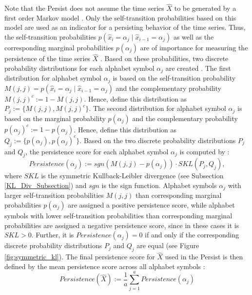Note that the Persist does not assume the time series $\hat{X}$ to be generated by a first order Markov model \cite{Persist}. Only the self-transition probabilities based on this model are used as an indicator for a persisting behavior of the time series. \newline
Thus, the self-transition probabilities $p(\hat{x}_i = \alpha_j \mid \hat{x}_{i-1} = \alpha_j)$ as well as the corresponding marginal probabilities $p(\alpha_j)$ are of importance for measuring the persistence of the time series $\hat{X}$ \cite{Persist}. Based on these probabilities, two discrete probability distributions for each alphabet symbol $\alpha_j$ are created \cite{Persist}. The first distribution for alphabet symbol $\alpha_j$ is based on the self-transition probability $M(j,j) = p(\hat{x}_i = \alpha_j \mid \hat{x}_{i-1} = \alpha_j)$ and the complementary probability $M(j,j)^c := 1 - M(j,j)$. Hence, define this distribution as $P_j := \{M(j,j), M(j,j)^c\}$. The second distribution for alphabet symbol $\alpha_j$ is based on the marginal probability $p(\alpha_j)$ and the complementary probability $p(\alpha_j)^c := 1 - p(\alpha_j)$. Hence, define this distribution as $Q_j := \{p(\alpha_j), p(\alpha_j)^c\}$. \newline
Based on the two discrete probability distributions $P_j$ and $Q_j$, the persistence score for each alphabet symbol $\alpha_j$ is computed by \cite{Persist}:
\begin{equation}
Persistence(\alpha_j) := sgn(M(j,j)-p(\alpha_j)) \cdot SKL(P_j,Q_j),
\label{eq:persistence_symbol}
\end{equation}
where $SKL$ is the symmetric Kullback-Leibler divergence (see Subsection \ref{KL_Div_Subsection}) and $sgn$ is the sign function. Alphabet symbols $\alpha_j$ with larger self-transition probabilities $M(j,j)$ than corresponding marginal probabilities $p(\alpha_j)$ are assigned a positive persistence score, while alphabet symbols with lower self-transition probabilities than corresponding marginal probabilities are assigned a negative persistence score, since in these cases it is $SKL > 0$. Further, it is $Persistence(\alpha_j) = 0$ if and only if the corresponding discrete probability distributions $P_j$ and $Q_j$ are equal \cite{Persist} (see Figure \ref{fig:symmetric_kl}). \newline
The final persistence score for $\hat{X}$ used in the Persist is then defined by the mean persistence score across all alphabet symbols \cite{Persist}:
\begin{equation}
Persistence(\hat{X}) := \frac{1}{a} \sum_{j=1}^{a} Persistence(\alpha_j)
\label{eq:persistence}
\end{equation}

